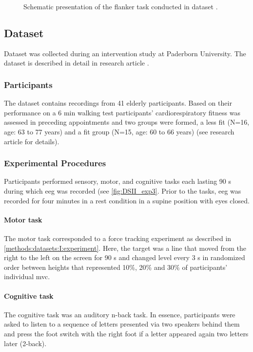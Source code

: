 \begin{figure}[h]
\begin{center}

\caption[Schematic presentation of the flanker task conducted in dataset .]{Schematic presentation of the flanker task conducted in dataset .}
\label{fig:DSII_exp2}
\end{center}
\end{figure}

\subsection{Dataset }
\label{methods:datasets:III}
Dataset  was collected during an intervention study at Paderborn University. The dataset is described in detail in research article  \cite{Goelz2021b}. 

\subsubsection{Participants}
\label{methods:datasets:III:participants}
The dataset contains recordings from 41 elderly participants. Based on their performance on a 6 min walking test participants’ cardiorespiratory fitness was assessed in preceding appointments and two groups were formed, a less fit (N=16, age: 63 to 77 years) and a fit group (N=15, age: 60 to 66 years) (see research article  \cite{Goelz2021b} for details).

\subsubsection{Experimental Procedures}
\label{methods:datasets:II:experiment}
Participants performed sensory, motor, and cognitive tasks each lasting 90 s during which \gls{eeg} was recorded (see \autoref{fig:DSII_exp3}. Prior to the tasks, \gls{eeg} was recorded for four minutes in a rest condition in a supine position with eyes closed. 
\paragraph{Motor task} 
The motor task corresponded to a force tracking experiment as described in \autoref{methods:datasets:I:experiment}. Here, the target was a line that moved from the right to the left on the screen for 90 s and changed level every 3 s in randomized order between heights that represented 10\%, 20\% and 30\% of participants' individual \gls{mvc}.
\paragraph{Cognitive task}
The cognitive task was an auditory n-back task. In essence, participants were asked to listen to a sequence of letters presented via two speakers behind them and press the foot switch with the right foot if a letter appeared again two letters later (2-back).
